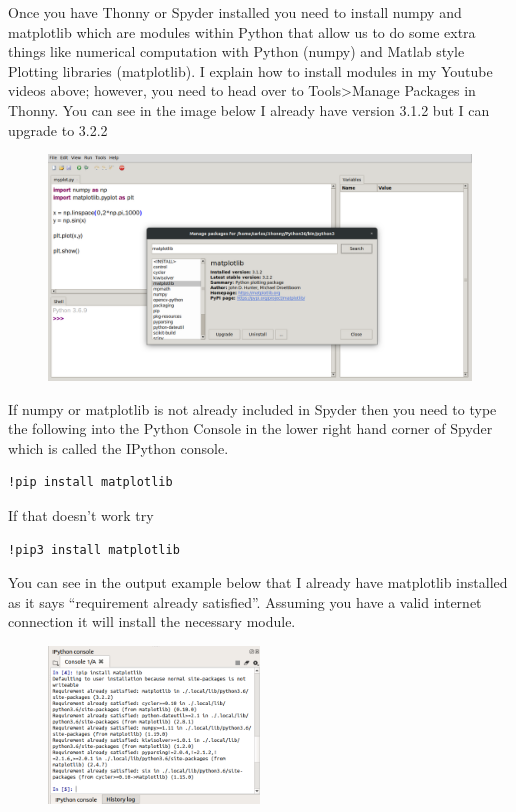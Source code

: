 Once you have Thonny or Spyder installed you need to install numpy and
matplotlib which are modules within Python that allow us to do some
extra things like numerical computation with Python (numpy) and Matlab
style Plotting libraries (matplotlib). I explain how to install
modules in my Youtube videos above; however, you need to head over to
Tools>Manage Packages in Thonny. You can see in the image below I
already have version 3.1.2 but I can upgrade to 3.2.2

\begin{figure}[H]
  \begin{center}
    \includegraphics[width=\textwidth]{Figures/IDE_upgrades.png}
  \end{center}
\end{figure}

If numpy or matplotlib is not already included in Spyder then you need
to type the following into the Python Console in the lower right hand
corner of Spyder which is called the IPython console. 

\begin{verbatim}
!pip install matplotlib
\end{verbatim}

If that doesn’t work try

\begin{verbatim}
!pip3 install matplotlib
\end{verbatim}

You can see in the output example below that I already have matplotlib
installed as it says “requirement already satisfied”. Assuming you
have a valid internet connection it will install the necessary
module. 
\begin{figure}[H]
  \begin{center}
    \includegraphics[width=0.5\textwidth]{Figures/console_thonny.png}
  \end{center}
\end{figure}

